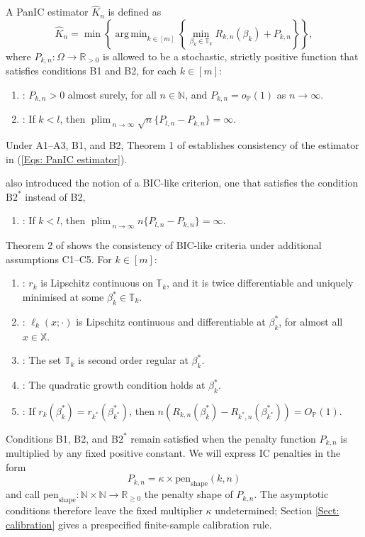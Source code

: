 \documentclass[12pt]{article}
\DeclareMathOperator*{\argmin}{arg\,min}
\DeclareMathOperator*{\plim}{plim\,}
\theoremstyle{remark}
\theoremstyle{plain}
\begin{document}
A PanIC estimator $\hat{K}_n$ is defined as
\begin{equation}\label{Eqs: PanIC estimator}
    \hat{K}_n = \min\left\{\argmin_{k \in \left[m\right]} \left\{\min_{\beta_k \in \mathbb{T}_k}R_{k,n}(\beta_k) + P_{k,n}\right\}\right\},
\end{equation}
where $P_{k,n}: \Omega \to \mathbb{R}_{>0}$ is allowed to be a stochastic, strictly positive function that satisfies conditions B1 and B2, for each $k \in \left[m\right]$:
\begin{enumerate}
    \item[B1]: $P_{k, n} > 0$ almost surely, for all $n \in \mathbb{N}$, and $P_{k, n}= o_{\mathbb{P}}(1)$ as $n\to\infty$.
    \item[B2]: If $k < l$, then $\plim_{n\to\infty}\sqrt{n}\{P_{l,n}-P_{k,n}\}=\infty$.
\end{enumerate}
Under A1--A3, B1, and B2, Theorem 1 of \cite{nguyen_panic:_2023} establishes consistency of the estimator in (\ref{Eqs: PanIC estimator}).

\cite{nguyen_panic:_2023} also introduced the notion of a BIC-like criterion, one that satisfies the condition $\mathrm{B2}^*$ instead of B2,
\begin{enumerate}
    \item[$\mathrm{B2}^*$]: If $k < l$, then $\plim_{n\to\infty}n\{P_{l,n}-P_{k,n}\}=\infty$.
\end{enumerate}
Theorem 2 of \cite{nguyen_panic:_2023} shows the consistency of BIC-like criteria under additional assumptions C1--C5. For $k \in \left[m\right]$:
\begin{enumerate}
    \item[C1]: $r_k$ is Lipschitz continuous on $\mathbb{T}_k$, and it is twice differentiable and uniquely minimised at some $\beta^*_k\in\mathbb{T}_k$.
    \item[C2]: $\ell_k(x; \cdot)$ is Lipschitz continuous and differentiable at $\beta^*_k$, for almost all $x\in\mathbb{X}$.
    \item[C3]: The set $\mathbb{T}_k$ is second order regular at $\beta^*_k$.
    \item[C4]: The quadratic growth condition holds at $\beta^*_k$.
    \item[C5]: If $r_k(\beta^*_k) = r_{k^*}(\beta^*_{k^*})$, then $n(R_{k,n}(\beta^*_k) - R_{k^*,n}(\beta^*_{k^*})) = O_{\mathbb{P}}(1)$.
\end{enumerate}

Conditions B1, B2, and $\mathrm{B2}^*$ remain satisfied when the penalty function $P_{k,n}$ is multiplied by any fixed positive constant. We will express IC penalties in the form
\begin{equation}\label{Eqs: Penalty Shape}
    P_{k, n} = \kappa \times \mathrm{pen}_{\mathrm{shape}}(k,n)
\end{equation}
and call $\mathrm{pen}_{\mathrm{shape}}:\mathbb{N}\times\mathbb{N}\rightarrow \mathbb{R}_{\geq 0}$ the penalty shape of $P_{k,n}$. The asymptotic conditions therefore leave the fixed multiplier $\kappa$ undetermined; Section \ref{Sect: calibration} gives a prespecified finite-sample calibration rule.
\end{document}
